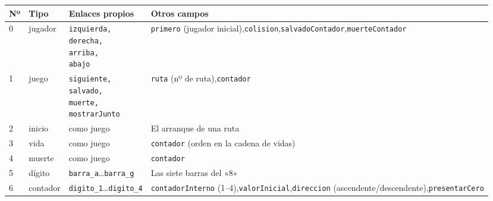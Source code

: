\begin{table}[H]
	\centering
	\begin{tabularx}{\textwidth}{l l l X}
		\toprule
		Nº & Tipo & Enlaces propios & Otros campos \\
		\midrule
		0 & jugador & \makecell[tl]{\texttt{izquierda,}\\ \texttt{derecha,}\\ \texttt{arriba,}\\ \texttt{abajo}} & \texttt{primero} (jugador inicial),\newline \texttt{colision},\newline \texttt{salvadoContador},\newline \texttt{muerteContador} \\
		
		\cmidrule(lr){1-4}
		
		1 & juego & \makecell[tl]{\texttt{siguiente,}\\ \texttt{salvado,}\\ \texttt{muerte,}\\ \texttt{mostrarJunto}} & \texttt{ruta} (nº de ruta),\newline \texttt{contador} \\
		
		\cmidrule(lr){1-4}
		
		2 & inicio & como juego & El arranque de una ruta \\
		
		\cmidrule(lr){1-4}
		
		3 & vida & como juego & \texttt{contador} (orden en la cadena de vidas) \\
		
		\cmidrule(lr){1-4}
		
		4 & muerte & como juego & \texttt{contador} \\
		
		\cmidrule(lr){1-4}
		
		5 & dígito & \texttt{barra\_a}\ldots{}\texttt{barra\_g} & Las siete barras del «8» \\
		
		\cmidrule(lr){1-4}
		
		6 & contador & \texttt{digito\_1}\ldots{}\texttt{digito\_4} & \texttt{contadorInterno} (1--4),\newline \texttt{valorInicial},\newline \texttt{direccion} (ascendente/descendente),\newline \texttt{presentarCero} \\
		

\end{tabularx}
\end{table}
